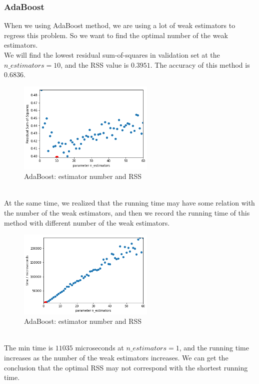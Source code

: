 \documentclass{article}
\begin{document}
\subsubsection{AdaBoost}
When we using AdaBoost method, we are using a lot of weak estimators to regress this problem. So we want to find the optimal number of the weak estimators.
\\We will find the lowest residual sum-of-squares in validation set at the $n\_estimators =10$, and the RSS value is $0.3951$. The accuracy of this method is $0.6836$.
\begin{figure}[h]
	\centering
	\includegraphics[width=6.5cm]{adaboost1.jpg}
	\caption{AdaBoost: estimator number and RSS}
\end{figure}
\\At the same time, we realized that the running time may have some relation with the number of the weak estimators, and then we record the running time of this method with different number of the weak estimators.
\begin{figure}[h]
	\centering
	\includegraphics[width=6.5cm]{adaboost2.jpg}
	\caption{AdaBoost: estimator number and RSS}
\end{figure}
\\The min time is $11035$ microseconds at $n\_estimators =1$, and the running time increases as the number of the weak estimators increases. We can get the conclusion that the optimal RSS may not correspond with the shortest running time.
\end{document}
